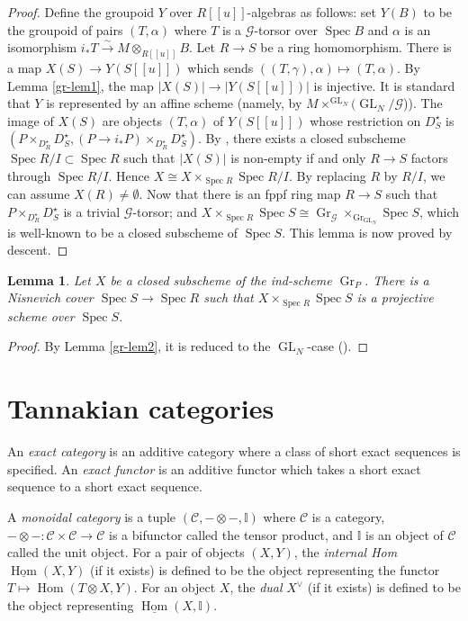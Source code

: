 \documentclass[11pt]{amsart}
\newtheorem{lem}{Lemma}
\numberwithin{thm}{section}
\numberwithin{lem}{section}
\numberwithin{cor}{section}
\numberwithin{prop}{section}
\numberwithin{exam}{section}
\numberwithin{dfn}{section}
\newcommand{\GR}{\operatorname{Gr}}
\newcommand{\GL}{\operatorname{GL}}
\newcommand{\Hom}{\operatorname{Hom}}
\newcommand{\iHom}{\underline{\operatorname{Hom}}}
\newcommand{\spec}{\operatorname{Spec}}
\newcommand{\mychapter}{\section}
\newcommand{\cC}{\mathcal{C}}
\newcommand{\cG}{\mathcal{G}}
\newcommand{\bI}{\mathbb{I}}
\begin{document}
\begin{appendices}
\begin{proof}
Define the groupoid $Y$ over $R[\![u]\!]$-algebras as follows:
set $Y(B)$ to be the groupoid of pairs $(T, \alpha)$
where $T$ is a $\cG$-torsor over $\spec B$ and 
$\alpha$ is an isomorphism $i_*T \xrightarrow{\sim}M\otimes_{R[\![u]\!]}B$.
Let $R\to S$ be a ring homomorphism.
There is a map
$X(S)\to Y(S[\![u]\!])$ which sends
$((T,\gamma),\alpha)\mapsto (T,\alpha)$.
By Lemma \ref{gr-lem1},
the map $|X(S)|\to |Y(S[\![u]\!])|$ is injective.
It is standard that $Y$ is represented by an affine scheme
(namely, by $M\times^{\GL_N}(\GL_N/\cG$)).
The image of $X(S)$ are objects $(T,\alpha)$ of $Y(S[\![u]\!])$
whose restriction on $D_S^\star$
is $(P\times_{D_R^\star}D_S^\star, (P\to i_*P)\times_{D_R^\star}D_S^\star)$.
By \cite[Lemma 3.3.9]{Lev13},
there exists a closed subscheme $\spec R/I \subset \spec R$ such that
$|X(S)|$ is non-empty if and only
$R\to S$ factors through $\spec R/I$.
Hence $X \cong X\times_{\spec R}\spec R/I$.
By replacing $R$ by $R/I$,
we can assume $X(R) \ne \emptyset$.
Now that there is an fppf ring map $R\to S$ such that
$P\times_{D_R^\star}D_S^\star$ is a trivial $\cG$-torsor;
and $X\times_{\spec R}\spec S \cong \GR_{\cG}\times_{\GR_{\GL_N}}\spec S$,
which is well-known to be a closed subscheme of $\spec S$.
This lemma is now proved by descent.
\end{proof}


\begin{lem}
\label{gr-lem3}
Let $X$ be a closed subscheme of the ind-scheme $\GR_P$.
There is a Nisnevich cover $\spec S\to \spec R$ such that
$X\times_{\spec R}\spec S$ is a projective scheme over $\spec S$.
\end{lem}

\begin{proof}
By Lemma \ref{gr-lem2}, it is reduced to the $\GL_N$-case (\cite[Proposition 3.8]{Dri06}).
\end{proof}


\mychapter{Tannakian categories}
\label{tan-cat}

An \textit{exact category} is an additive category where a class
of short exact sequences is specified.
An \textit{exact functor} is an additive functor
which takes a short exact sequence
to a short exact sequence.

A \textit{monoidal category} is a tuple $(\cC,-\otimes-, \bI)$
where $\cC$ is a category,
$-\otimes-:\cC\times \cC\to \cC$ is a bifunctor called the tensor product,
and $\bI$ is an object of $\cC$ called the unit object.
For a pair of objects $(X, Y)$, the \textit{internal Hom} 
$\iHom(X,Y)$ (if it exists) is defined to be
the object representing the functor
$T \mapsto \Hom(T\otimes X, Y)$.
For an object $X$, the \textit{dual} $X^\vee$ (if it exists)
is defined to be the object representing $\iHom(X, \bI)$.


\end{appendices}
\end{document}

